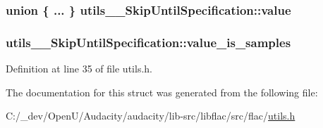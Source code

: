 \subsubsection[{\texorpdfstring{value}{value}}]{\setlength{\rightskip}{0pt plus 5cm}union \{ ... \}   utils\+\_\+\+\_\+\+Skip\+Until\+Specification\+::value}\hypertarget{structutils_____skip_until_specification_ad0878e1e24888a902faa423236a7cc47}{}\label{structutils_____skip_until_specification_ad0878e1e24888a902faa423236a7cc47}
\subsubsection[{\texorpdfstring{value\+\_\+is\+\_\+samples}{value_is_samples}}]{ utils\+\_\+\+\_\+\+Skip\+Until\+Specification\+::value\+\_\+is\+\_\+samples}\hypertarget{structutils_____skip_until_specification_a2808046d55dfe4bae453b5399b0cd416}{}\label{structutils_____skip_until_specification_a2808046d55dfe4bae453b5399b0cd416}


Definition at line 35 of file utils.\+h.



The documentation for this struct was generated from the following file\+:\begin{DoxyCompactItemize}
\item 
C\+:/\+\_\+dev/\+Open\+U/\+Audacity/audacity/lib-\/src/libflac/src/flac/\hyperlink{libflac_2src_2flac_2utils_8h}{utils.\+h}\end{DoxyCompactItemize}

